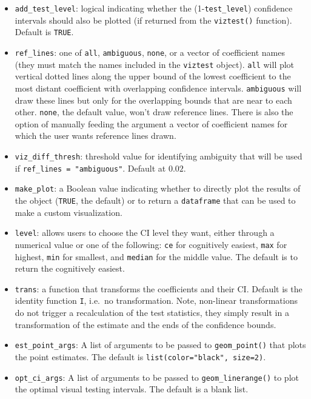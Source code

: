 \begin{itemize}
\tightlist
\item
  \texttt{add\_test\_level}: logical indicating whether the (1-\texttt{test\_level}) confidence intervals should also be plotted (if returned from the \texttt{viztest()} function). Default is \texttt{TRUE}.
\item
  \texttt{ref\_lines}: one of \texttt{all}, \texttt{ambiguous}, \texttt{none}, or a vector of coefficient names (they must match the names included in the \texttt{viztest} object). \texttt{all} will plot vertical dotted lines along the upper bound of the lowest coefficient to the most distant coefficient with overlapping confidence intervals. \texttt{ambiguous} will draw these lines but only for the overlapping bounds that are near to each other. \texttt{none}, the default value, won't draw reference lines. There is also the option of manually feeding the argument a vector of coefficient names for which the user wants reference lines drawn.
\item
  \texttt{viz\_diff\_thresh}: threshold value for identifying ambiguity that will be used if \texttt{ref\_lines\ =\ "ambiguous"}. Default at \(0.02\).
\item
  \texttt{make\_plot}: a Boolean value indicating whether to directly plot the results of the object (\texttt{TRUE}, the default) or to return a \texttt{dataframe} that can be used to make a custom visualization.
\item
  \texttt{level}: allows users to choose the CI level they want, either through a numerical value or one of the following: \texttt{ce} for cognitively easiest, \texttt{max} for highest, \texttt{min} for smallest, and \texttt{median} for the middle value. The default is to return the cognitively easiest.
\item
  \texttt{trans}: a function that transforms the coefficients and their CI. Default is the identity function \texttt{I}, i.e.~no transformation. Note, non-linear transformations do not trigger a recalculation of the test statistics, they simply result in a transformation of the estimate and the ends of the confidence bounds.
\item
  \texttt{est\_point\_args}: A list of arguments to be passed to \texttt{geom\_point()} that plots the point estimates. The default is \texttt{list(color="black",\ size=2)}.
\item
  \texttt{opt\_ci\_args}: A list of arguments to be passed to \texttt{geom\_linerange()} to plot the optimal visual testing intervals. The default is a blank list.

\end{itemize}
